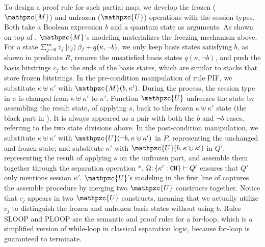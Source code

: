 To design a proof rule for such partial map, we develop the frozen ($\mathpzc{M}$) and unfrozen ($\mathpzc{U}$) operations with the session types. Both take a Boolean expression $b$ and a quantum state as arguments. As shown on top of , $\mathpzc{M}$'s modeling materializes the freezing mechanism above. For a state $\scha{m}{z_j}{c_{j}}{\beta_j}+q(\kappa,\neg b)$, we only keep basis states satisfying $b$, as shown in predicate $R$, remove the unsatisfied basis states $q(\kappa,\neg b)$, and push the basis bitstrings $c_{j}$ to the ends of the basis states, which are similar to stacks that store frozen bitstrings.
In the pre-condition manipulation of rule \textsc{PIF}, we substitute $\kappa \uplus \kappa'$ with $\mathpzc{M}(b,\kappa')$. During the process, the session type in $\sigma$ is changed from $\kappa \uplus \kappa'$ to $\kappa'$.
Function $\mathpzc{U}$ unfreezes the state by assembling the result state, of applying $s$, back to the frozen $\kappa \uplus \kappa'$ state (the black part in ). It is always appeared as a pair with both the $b$ and $\neg b$ cases, referring to the two state divisions above. In the post-condition manipulation, we substitute $\kappa \uplus \kappa'$ with $\mathpzc{U}(\neg b,\kappa \uplus \kappa')$ in $P$, representing the unchanged and frozen state; and substitute $\kappa'$ with $\mathpzc{U}(b,\kappa \uplus \kappa')$ in $Q'$, representing the result of applying $s$ on the unfrozen part, and assemble them together through the separation operation $*$. 
$\Omega;\{\kappa' : \texttt{CH}\} \vdash Q'$ ensures that $Q'$ only mentions session $\kappa'$.
$\mathpzc{U}$'s modeling in the first line of  captures the assemble procedure by merging two $\mathpzc{U}$ constructs together. Notice that $c_{j}$ appears in two $\mathpzc{U}$ constructs, meaning that we actually utilize $c_j$ to distinguish the frozen and unfrozen basis states without using $b$.
Rules \textsc{SLOOP} and \textsc{PLOOP} are the semantic and proof rules for a for-loop, which is a simplified version of while-loop in classical separation logic, because for-loop is guaranteed to terminate.

